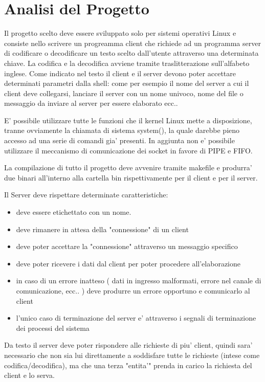 \documentclass[12pt]{article}
\begin{document}


\section{Analisi del Progetto}
Il progetto scelto deve essere sviluppato solo per sistemi operativi Linux e consiste nello scrivere un progreamma client che richiede ad un programma server di codificare o decodificare un testo scelto dall'utente attraverso una determinata chiave. La codifica e la decodifica avviene tramite traslitterazione sull'alfabeto inglese. Come indicato nel testo il client e il server devono poter accettare determinati parametri dalla shell: come per esempio il nome del server a cui il client deve collegarsi, lanciare il server con un nome univoco, nome del file o messaggio da inviare al server per essere elaborato ecc..

E' possibile utilizzare tutte le funzioni che il kernel Linux mette a disposizione, tranne ovviamente la chiamata di sistema system(), la quale darebbe pieno accesso ad una serie di comandi gia' presenti. In aggiunta non e' possibile utilizzare il meccanismo di comunicazione dei socket in favore di PIPE e FIFO.

La compilazione di tutto il progetto deve avvenire tramite makefile e produrra' due binari all'interno alla cartella bin rispettivamente per il client e per il server.


Il Server deve rispettare determinate caratteristiche:
\begin{itemize}
    \item deve essere etichettato con un nome.
    \item deve rimanere in attesa della "connessione" di un client
    \item deve poter accettare la "connessione" attraverso un messaggio specifico
    \item deve poter ricevere i dati dal client per poter procedere all'elaborazione
    \item in caso di un errore inatteso ( dati in ingresso malformati, errore nel canale di comunicazione, ecc.. ) deve produrre un errore opportuno e comunicarlo al client 
    \item l'unico caso di terminazione del server e' attraverso i segnali di terminazione dei processi del sistema
\end{itemize}

Da testo il server deve poter rispondere alle richieste di piu' client, quindi sara' necessario che non sia lui direttamente a soddisfare tutte le richieste (intese come codifica/decodifica), ma che una terza "entita'" prenda in carico la richiesta del client e lo serva.
\end{document}
